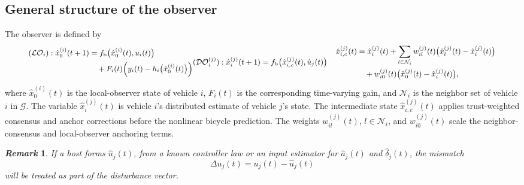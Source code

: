 \documentclass[letterpaper,journal]{IEEEtran}
\def\G{\mathcal{G}} %
\def\N{\mathcal{N}} %
\def\LO{\mathcal{LO}} %
\def\DO{\mathcal{DO}} %
\newtheorem{remark}{\it Remark}%
\begin{document}
\subsection{General structure of the observer}
The observer is defined by
\begin{subequations}\label{eq_observer}
\begin{small}
\begin{align}\label{eq_LO}
(\LO_i): \hat{x}_{0}^{(i)}(t+1)
&= f_{\text{b}}\big(\hat{x}_{0}^{(i)}(t),u_i(t)\big)\notag \\
&\quad + F_i(t)\Big(y_i(t)-h_i\big(\hat{x}_{0}^{(i)}(t)\big)\Big) %
\end{align}
\begin{align}\label{eq_DO}
(\DO_i^{(j)}): \hat{x}^{(j)}_i(t+1)
&= f_{\text{b}}\big(\hat{x}_{i,c}^{(j)}(t),\hat{u}_j(t)\big) %
\end{align}
\begin{align}\label{eq_consensus_state}
\hat{x}_{i,c}^{(j)}(t)
&= \hat{x}_i^{(j)}(t)
+\sum_{l \in \N_i} w_{il}^{(j)}(t)
   \big(\hat{x}_l^{(j)}(t)-\hat{x}_i^{(j)}(t)\big)\notag\\
&\quad + w_{i0}^{(j)}(t)
   \big(\hat{x}_0^{(j)}(t)-\hat{x}_i^{(j)}(t)\big),
\end{align}
\end{small}
\end{subequations}
where $\hat{x}_{0}^{(i)}(t)$ is the local-observer state of vehicle $i$, $F_i(t)$ is the corresponding time-varying gain, and $\N_i$ is the neighbor set of vehicle $i$ in $\G$. The variable $\hat{x}_i^{(j)}(t)$ is vehicle $i$'s distributed estimate of vehicle $j$'s state. The intermediate state $\hat{x}_{i,c}^{(j)}(t)$ applies trust-weighted consensus and anchor corrections before the nonlinear bicycle prediction. The weights $w_{il}^{(j)}(t)$, $l \in \N_i$, and $w_{i0}^{(j)}(t)$ scale the neighbor-consensus and local-observer anchoring terms. 

\begin{remark}\label{rem1}
If a host forms $\hat{u}_j(t)$, from a known controller law or an input estimator for $\hat a_j(t)$ and $\hat\delta_j(t)$, the mismatch
\begin{equation}
    \Delta u_j(t) = u_j(t) - \hat{u}_j(t)
\end{equation}
will be treated as part of the disturbance vector. %
\end{remark}
\end{document}
